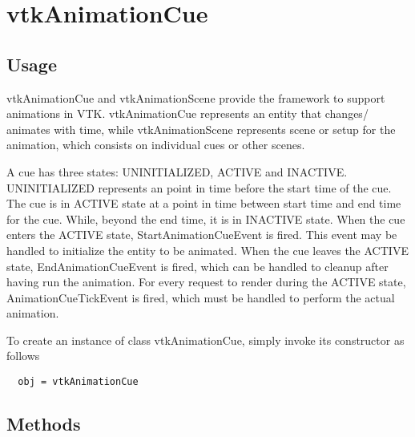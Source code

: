 \section{vtkAnimationCue}

\subsection{Usage}

 vtkAnimationCue and vtkAnimationScene provide the framework to support
 animations in VTK. vtkAnimationCue represents an entity that changes/
 animates with time, while vtkAnimationScene represents scene or setup 
 for the animation, which consists on individual cues or other scenes.

 A cue has three states: UNINITIALIZED, ACTIVE and INACTIVE.
 UNINITIALIZED represents an point in time before the start time of the cue.
 The cue is in ACTIVE state at a point in time between start time and end time
 for the cue. While, beyond the end time, it is in INACTIVE state.
 When the cue enters the ACTIVE state, StartAnimationCueEvent is fired. This 
 event may be handled to initialize the entity to be animated.
 When the cue leaves the ACTIVE state, EndAnimationCueEvent is fired, which 
 can be handled to cleanup after having run the animation.
 For every request to render during the ACTIVE state, AnimationCueTickEvent is
 fired, which must be handled to perform the actual animation. 

To create an instance of class vtkAnimationCue, simply
invoke its constructor as follows
\begin{verbatim}
  obj = vtkAnimationCue
\end{verbatim}
\subsection{Methods}

